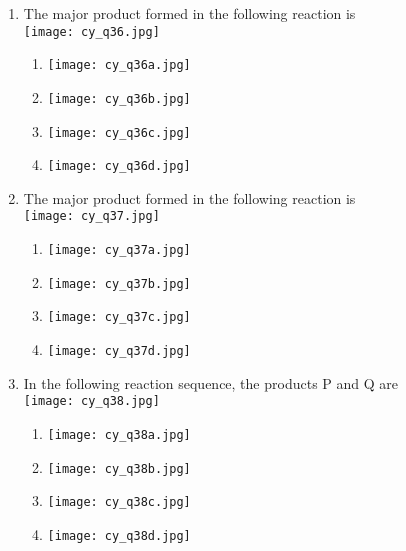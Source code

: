 \documentclass[12pt]{article}
\begin{document}
\begin{enumerate}[label=Q.\arabic*]
							\item The major product formed in the following reaction is\\[1ex]
							\texttt{[image: cy\_q36.jpg]}\\[-1ex]
							\begin{multicols}{2}
							\begin{enumerate}
							\item \texttt{[image: cy\_q36a.jpg]}
							\item \texttt{[image: cy\_q36b.jpg]}
							\item \texttt{[image: cy\_q36c.jpg]}
							\item \texttt{[image: cy\_q36d.jpg]}
							\end{enumerate}
							\end{multicols}

							\item The major product formed in the following reaction is\\[1ex]
							\texttt{[image: cy\_q37.jpg]}\\[-1ex]
							\begin{enumerate}[label=(\Alph*)]
							\item \texttt{[image: cy\_q37a.jpg]}
							\item \texttt{[image: cy\_q37b.jpg]}
							\item \texttt{[image: cy\_q37c.jpg]}
							\item \texttt{[image: cy\_q37d.jpg]}
							\end{enumerate}

							\item In the following reaction sequence, the products P and Q are\\[1ex]
							\texttt{[image: cy\_q38.jpg]}

							\vspace{1ex}
							\begin{multicols}{2}
							\begin{enumerate}[label=(\Alph*)]
							\item \texttt{[image: cy\_q38a.jpg]}
							\item \texttt{[image: cy\_q38b.jpg]}
							\item \texttt{[image: cy\_q38c.jpg]}
							\item \texttt{[image: cy\_q38d.jpg]}
							\end{enumerate}
							\end{multicols}


\end{enumerate}
\end{document}
